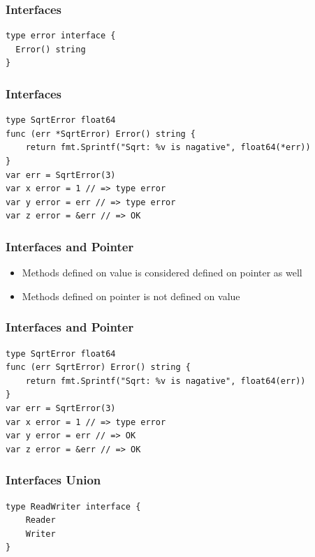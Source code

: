 \documentclass[xetex,mathserif,serif,12pt]{beamer}
\begin{document}
\begin{frame}[fragile]
  \frametitle{Interfaces}

  \begin{beamer@nomargin}
    \begin{lstlisting}
type error interface {
  Error() string
}
    \end{lstlisting}
  \end{beamer@nomargin}
\end{frame}

\begin{frame}[fragile]
  \frametitle{Interfaces}

  \begin{beamer@nomargin}
    \begin{lstlisting}
type SqrtError float64
func (err *SqrtError) Error() string {
	return fmt.Sprintf("Sqrt: %v is nagative", float64(*err))
}
var err = SqrtError(3)
var x error = 1 // => type error
var y error = err // => type error
var z error = &err // => OK
    \end{lstlisting}
  \end{beamer@nomargin}
\end{frame}

\begin{frame}
  \frametitle{Interfaces and Pointer}

  \begin{itemize}
  \item Methods defined on value is considered defined on pointer as well
  \item Methods defined on pointer is not defined on value
  \end{itemize}
\end{frame}

\begin{frame}[fragile]
  \frametitle{Interfaces and Pointer}

  \begin{beamer@nomargin}
    \begin{lstlisting}
type SqrtError float64
func (err SqrtError) Error() string {
	return fmt.Sprintf("Sqrt: %v is nagative", float64(err))
}
var err = SqrtError(3)
var x error = 1 // => type error
var y error = err // => OK
var z error = &err // => OK
    \end{lstlisting}
  \end{beamer@nomargin}
\end{frame}


\begin{frame}[fragile]
  \frametitle{Interfaces Union}

  \begin{beamer@nomargin}
    \begin{lstlisting}
type ReadWriter interface {
    Reader
    Writer
}
    \end{lstlisting}
  \end{beamer@nomargin}
\end{frame}
\end{document}
